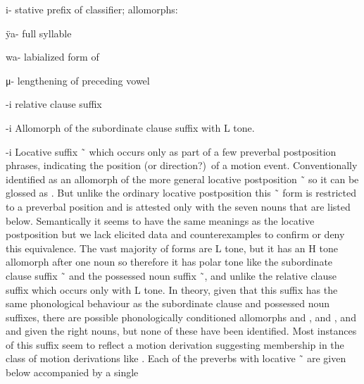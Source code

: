 \begin{morphdesc}[resume*=alphalist]
\item[i-]\label{m:i-stv}
	stative prefix of classifier;
	\newline
	allomorphs:
	\begin{allolist}
	\item[ÿa-]	full syllable
	\item[wa-]	labialized form of 
	\item[μ-]	lengthening of preceding vowel
	\end{allolist}

\item[-i]\label{m:-i-rel}
	relative clause suffix

\item[-i]\label{m:-i-sub}
	Allomorph of the subordinate clause suffix  with L tone.

\item[-i]\label{m:-i-loc}
	Locative suffix  \~\  which occurs only as part of a few preverbal postposition
		phrases, indicating the position (or direction?)\ of a motion event.
	Conventionally identified as an allomorph of the more general locative postposition
		 \~\  \parencites[33, 134, 138, 301]{leer:1991}
		so it can be glossed as .
	But unlike the ordinary locative postposition this  \~\  form is restricted to a
		preverbal position and is attested only with the seven nouns that are listed below.
	Semantically it seems to have the same meanings as the locative postposition but we lack
		elicited data and counterexamples to confirm or deny this equivalence.
	The vast majority of forms are L tone, but it has an H tone allomorph after one noun so
		therefore it has polar tone
		like the subordinate clause suffix  \~\ 
		and the possessed noun suffix  \~\ ,
		and unlike the relative clause suffix  which occurs only with L tone.
	In theory, given that this suffix has the same phonological behaviour as the subordinate clause
		and possessed noun suffixes, there are possible phonologically conditioned allomorphs
		 and ,  and , and  and 
		given the right nouns, but none of these have been identified.
	Most instances of this suffix seem to reflect a motion derivation
		suggesting membership in the class of motion derivations like
		.
	Each of the preverbs with locative  \~\  are given below accompanied by a single

\end{morphdesc}
